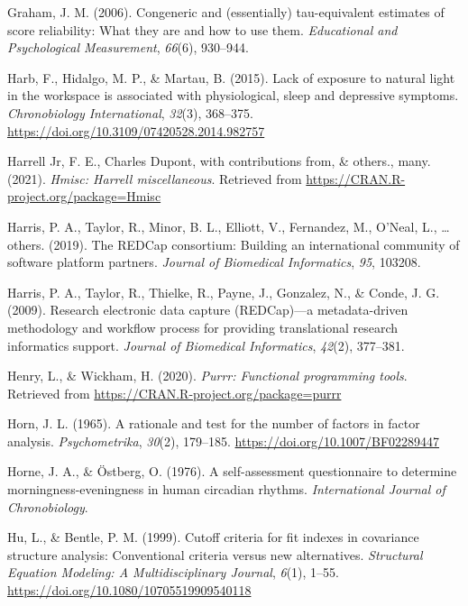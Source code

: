 \documentclass[
  english,
  man]{apa6}
\newlength{\cslhangindent}
\newlength{\cslentryspacingunit} %
\newenvironment{CSLReferences}[2] %
 {%
  \setlength{\parindent}{0pt}
  \ifodd #1
  \let\oldpar\par
  \def\par{\hangindent=\cslhangindent\oldpar}
  \fi
  \setlength{\parskip}{#2\cslentryspacingunit}
 }%
 {}
\begin{document}
\begin{CSLReferences}{1}{0}
\leavevmode{}%
Graham, J. M. (2006). Congeneric and (essentially) tau-equivalent estimates of score reliability: What they are and how to use them. \emph{Educational and Psychological Measurement}, \emph{66}(6), 930--944.

\leavevmode{}%
Harb, F., Hidalgo, M. P., \& Martau, B. (2015). Lack of exposure to natural light in the workspace is associated with physiological, sleep and depressive symptoms. \emph{Chronobiology International}, \emph{32}(3), 368--375. \url{https://doi.org/10.3109/07420528.2014.982757}

\leavevmode{}%
Harrell Jr, F. E., Charles Dupont, with contributions from, \& others., many. (2021). \emph{Hmisc: Harrell miscellaneous}. Retrieved from \url{https://CRAN.R-project.org/package=Hmisc}

\leavevmode{}%
Harris, P. A., Taylor, R., Minor, B. L., Elliott, V., Fernandez, M., O'Neal, L., \ldots{} others. (2019). The REDCap consortium: Building an international community of software platform partners. \emph{Journal of Biomedical Informatics}, \emph{95}, 103208.

\leavevmode{}%
Harris, P. A., Taylor, R., Thielke, R., Payne, J., Gonzalez, N., \& Conde, J. G. (2009). Research electronic data capture (REDCap)---a metadata-driven methodology and workflow process for providing translational research informatics support. \emph{Journal of Biomedical Informatics}, \emph{42}(2), 377--381.

\leavevmode{}%
Henry, L., \& Wickham, H. (2020). \emph{Purrr: Functional programming tools}. Retrieved from \url{https://CRAN.R-project.org/package=purrr}

\leavevmode{}%
Horn, J. L. (1965). A rationale and test for the number of factors in factor analysis. \emph{Psychometrika}, \emph{30}(2), 179--185. \url{https://doi.org/10.1007/BF02289447}

\leavevmode{}%
Horne, J. A., \& Östberg, O. (1976). A self-assessment questionnaire to determine morningness-eveningness in human circadian rhythms. \emph{International Journal of Chronobiology}.

\leavevmode{}%
Hu, L., \& Bentle, P. M. (1999). Cutoff criteria for fit indexes in covariance structure analysis: {Conventional} criteria versus new alternatives. \emph{Structural Equation Modeling: A Multidisciplinary Journal}, \emph{6}(1), 1--55. \url{https://doi.org/10.1080/10705519909540118}


\end{CSLReferences}
\end{document}
